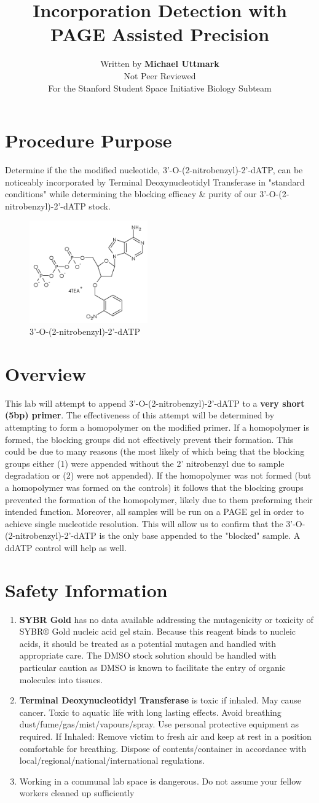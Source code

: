 \documentclass[letterpaper]{article}
\title{\BdATP{} Incorporation Detection with PAGE Assisted Precision} %
\author{Written by \textbf{Michael Uttmark}\\ %
		Not Peer Reviewed\\%
        For the Stanford Student Space Initiative Biology Subteam}
\newenvironment{safety}{%
\begin{tcolorbox}[width=\textwidth, colframe=safetyFrame, arc=1.5mm]
}%
{\end{tcolorbox}}
\newcommand{\tdt}{Terminal Deoxynucleotidyl Transferase}
\newcommand{\BdATP}{3'-O-(2-nitrobenzyl)-2'-dATP}
\newcommand{\B}[1]{\textbf{#1}}
\newcommand{\SYBRGOLD}{\item{\B{SYBR Gold} has no data available addressing the mutagenicity or toxicity of SYBR® Gold nucleic acid gel stain. Because this reagent binds to nucleic acids, it should be treated as a potential mutagen and handled with appropriate care. The DMSO stock solution should be handled with particular caution as DMSO is known to facilitate the entry of organic molecules into tissues.\cite{sybrGold}}}
\newcommand{\tdtSafety}{\item{\textbf{\tdt{}} is toxic if inhaled. May cause cancer. Toxic to aquatic life with long lasting effects. Avoid breathing dust/fume/gas/mist/vapours/spray. Use personal protective equipment as required. If Inhaled: Remove victim to fresh air and keep at rest in a position comfortable for breathing. Dispose of contents/container in accordance with local/regional/national/international regulations.\cite{Invitrogen2002}}}
\begin{document}
\maketitle
\section{Procedure Purpose} %
Determine if the the modified nucleotide, \BdATP{}, can be noticeably incorporated by \tdt{} in "standard conditions" while determining the blocking efficacy \& purity of our \BdATP{} stock.
\begin{figure}[ht]
\centering
\includegraphics[width=2in]{1.png}
\caption{\BdATP{}}
\label{bdatp}
\end{figure}
\section{Overview} %
This lab will attempt to append \BdATP{} to a \textbf{very short (5bp) primer}. The effectiveness of this attempt will be determined by attempting to form a homopolymer on the modified primer. If a homopolymer is formed, the blocking groups did not effectively prevent their formation. This could be due to many reasons (the most likely of which being that the blocking groups either (1) were appended without the 2' nitrobenzyl due to sample degradation or (2) were not appended). If the homopolymer was not formed (but a homopolymer was formed on the controls) it follows that the blocking groups prevented the formation of the homopolymer, likely due to them preforming their intended function. Moreover, all samples will be run on a PAGE gel in order to achieve single nucleotide resolution. This will allow us to confirm that the \BdATP{} is the only base appended to the "blocked" sample. A ddATP control will help as well.

\section{Safety Information}
\begin{safety}
\begin{enumerate}
\SYBRGOLD{} %
\tdtSafety{}
\item{Working in a communal lab space is dangerous. Do not assume your fellow workers cleaned up sufficiently}
\end{enumerate}
\end{safety}
\end{document}
